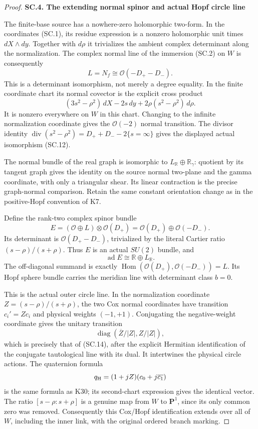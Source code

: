 \begin{proof}
\par

\medskip\noindent\textbf{SC.4. The extending normal spinor and actual Hopf circle line}

\par\nobreak

The finite-base source has a nowhere-zero holomorphic two-form. In the
coordinates (SC.1), its residue expression is a nonzero holomorphic
unit times \(dX\wedge dy\). Together with \(d\rho\) it trivializes the
ambient complex determinant along the normalization. The complex normal
line of the immersion (SC.2) on \(W\) is consequently
\[
 L=N_f\cong\mathcal O(-D_+-D_-).                     \tag{SC.12}
\]
This is a determinant isomorphism, not merely a degree equality. In the
finite coordinate chart its normal covector is the explicit cross product
\[
 (3s^2-\rho^2)\,dX-2s\,dy
                    +2\rho(s^2-\rho^2)\,d\rho.     \tag{SC.13}
\]
It is nonzero everywhere on \(W\) in this chart. Changing to the
infinite normalization coordinate gives the \(\mathcal O(-2)\)
normal transition. The divisor identity
\(\operatorname{div}(s^2-\rho^2)=D_++D_--2\{s=\infty\}\)
gives the displayed actual isomorphism (SC.12).

The normal bundle of the real graph is isomorphic to
\(L_{\mathbb R}\oplus\mathbb R_\gamma\): quotient by its tangent
graph gives the identity on the source normal two-plane and the gamma
coordinate, with only a triangular shear. Its linear contraction is
the precise graph-normal comparison. Retain the same constant orientation
change as in the positive-Hopf convention of K7.

Define the rank-two complex spinor bundle
\[
 E=(\mathcal O\oplus L)\otimes\mathcal O(D_+)
       =\mathcal O(D_+)\oplus\mathcal O(-D_-).        \tag{SC.14}
\]
Its determinant is \(\mathcal O(D_+-D_-)\), trivialized by the literal
Cartier ratio \((s-\rho)/(s+\rho)\). Thus \(E\) is an actual
\(SU(2)\) bundle, and
\[
 \operatorname{ad}E\cong
              \mathbb R\oplus L_{\mathbb R}.        \tag{SC.15}
\]
The off-diagonal summand is exactly
\(\operatorname{Hom}(\mathcal O(D_+),\mathcal O(-D_-))=L\).
Its Hopf sphere bundle carries the meridian line with determinant
class \(b=0\).

This is the actual outer circle line. In the normalization coordinate
\(Z=(s-\rho)/(s+\rho)\), the two Cox normal coordinates have transition
\(c_i'=Zc_i\) and physical weights \((-1,+1)\). Conjugating the
negative-weight coordinate gives the unitary transition
\[
       \operatorname{diag}(\overline Z/|Z|,Z/|Z|),
\]
which is precisely that of (SC.14), after the explicit Hermitian
identification of the conjugate tautological line with its dual. It
intertwines the physical circle actions. The quaternion formula
\[
 q_{\rm H}=(1+jZ)(c_0+j\overline{c_1})
\]
is the same formula as K30; its second-chart expression gives the
identical vector. The ratio \([s-\rho:s+\rho]\) is a genuine map from
\(W\) to \(\mathbf P^1\), since its only common zero was removed.
Consequently this Cox/Hopf identification extends over all of \(W\),
including the inner link, with the original ordered branch marking.


\end{proof}

